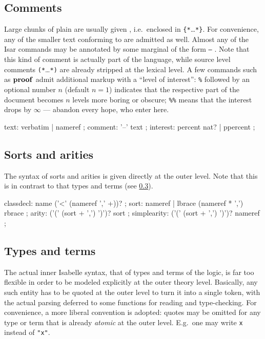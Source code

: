 \subsection{Comments}

Large chunks of plain  are usually given
, i.e.\ enclosed in \verb|{*|\dots\verb|*}|.  For
convenience, any of the smaller text conforming to  are
admitted as well.  Almost any of the Isar commands may be annotated by some
marginal  of the form \texttt{--} .
Note that this kind of comment is actually part of the language, while source
level comments \verb|(*|\dots\verb|*)| are already stripped at the lexical
level.  A few commands such as ${\mathord{\mathbf{proof}}}$ admit additional markup with a
``level of interest'': \texttt{\%} followed by an optional number $n$ (default
$n = 1$) indicates that the respective part of the document becomes $n$ levels
more boring or obscure; \texttt{\%\%} means that the interest drops by
$\infty$ --- abandon every hope, who enter here.

\begin{rail}
  text: verbatim | nameref
  ;
  comment: '--' text
  ;
  interest: percent nat? | ppercent
  ;
\end{rail}


\subsection{Sorts and arities}

The syntax of sorts and arities is given directly at the outer level.  Note
that this is in contrast to that types and terms (see \ref{sec:types-terms}).

\begin{rail}
  classdecl: name ('<' (nameref ',' +))?
  ;
  sort: nameref | lbrace (nameref * ',') rbrace
  ;
  arity: ('(' (sort + ',') ')')? sort
  ;
  simplearity: ('(' (sort + ',') ')')? nameref
  ;
\end{rail}


\subsection{Types and terms}\label{sec:types-terms}

The actual inner Isabelle syntax, that of types and terms of the logic, is far
too flexible in order to be modeled explicitly at the outer theory level.
Basically, any such entity has to be quoted at the outer level to turn it into
a single token, with the actual parsing deferred to some functions for reading
and type-checking.  For convenience, a more liberal convention is adopted:
quotes may be omitted for any type or term that is already \emph{atomic} at
the outer level.  E.g.\ one may write \texttt{x} instead of \texttt{"x"}.

